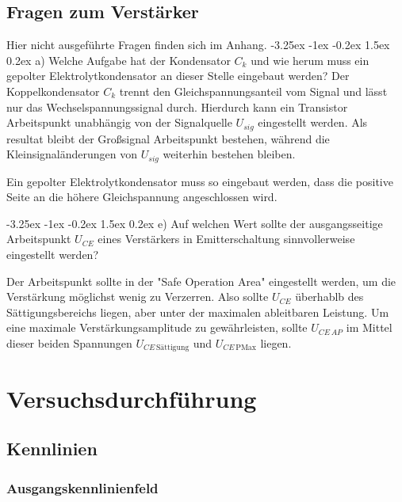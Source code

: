 \documentclass[
	a4paper, %
	12pt, %
]{CSUniSchoolLabReport}
\makeatletter
\renewcommand\paragraph{\@startsection{paragraph}{4}{\z@}%
  {-3.25ex \@plus -1ex \@minus -0.2ex}%
  {1.5ex \@plus 0.2ex}%
  {\normalfont\normalsize\bfseries}}
\makeatother
\begin{document}
\subsection{Fragen zum Verstärker}
Hier nicht ausgeführte Fragen finden sich im Anhang.
\paragraph{a) Welche Aufgabe hat der Kondensator $C_k$ und wie herum muss ein gepolter Elektrolytkondensator an dieser Stelle eingebaut werden?}
Der Koppelkondensator $C_k$ trennt den Gleichspannungsanteil vom Signal und lässt nur das Wechselspannungssignal durch.
Hierdurch kann ein Transistor Arbeitspunkt unabhängig von der Signalquelle $U_{sig}$ eingestellt werden. Als resultat bleibt der Großsignal Arbeitspunkt bestehen, während die Kleinsignaländerungen von $U_{sig}$ weiterhin bestehen bleiben. 



Ein gepolter Elektrolytkondensator muss so eingebaut werden, dass die positive Seite an die höhere Gleichspannung angeschlossen wird.


\paragraph{e) Auf welchen Wert sollte der ausgangsseitige Arbeitspunkt $U_{CE}$ eines Verstärkers in Emitterschaltung sinnvollerweise eingestellt werden? }

Der Arbeitspunkt sollte in der "Safe Operation Area" eingestellt werden, um die Verstärkung möglichst wenig zu Verzerren. Also sollte $U_{CE}$ überhablb des Sättigungsbereichs liegen, aber unter der maximalen ableitbaren Leistung. 
Um eine maximale Verstärkungsamplitude zu gewährleisten, sollte $U_{CE\,AP}$ im Mittel dieser beiden Spannungen $U_{CE\,\text{Sättigung}}$ und $U_{CE\,\text{PMax}}$ liegen.





\section{Versuchsdurchführung}
\subsection{Kennlinien }
\subsubsection{Ausgangskennlinienfeld}
\end{document}
